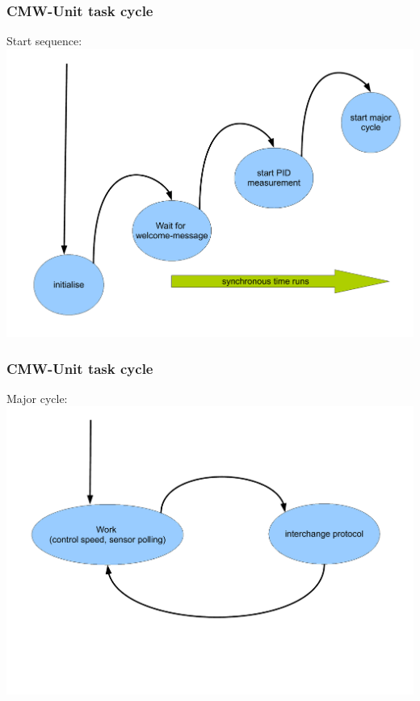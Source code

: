 \documentclass{beamer}
\begin{document}
\begin{frame}
	\frametitle{CMW-Unit task cycle}
	Start sequence:\\
	\includegraphics[scale=0.35]{figures/start.pdf}
\end{frame}

\begin{frame}
	\frametitle{CMW-Unit task cycle}
	Major cycle:\\
	\includegraphics[scale=0.35]{figures/majorcycle.pdf}
\end{frame}
\end{document}
